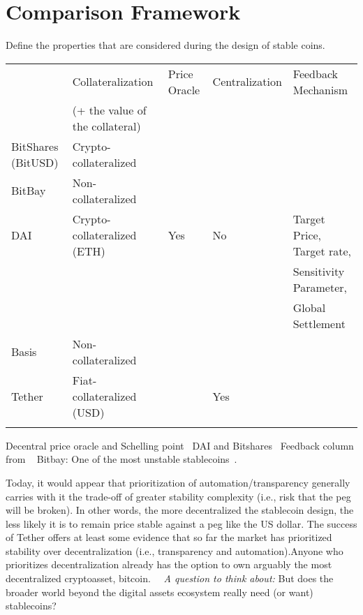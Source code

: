 \section{Comparison Framework} %
Define the properties that are considered during the design of stable coins.
~
\begin{table}[]
	\begin{tabular}{|l|l|l|l|l|}
		\hline
		& Collateralization  & Price Oracle & Centralization & Feedback Mechanism
		\\ &(+ the value of the collateral)&&&
		 \\ \hline
		BitShares (BitUSD) &  Crypto-collateralized &  & &\\ \hline
		BitBay & Non-collateralized & & & \\ \hline
		 DAI& Crypto-collateralized (ETH)  &  Yes& No & Target Price, Target rate,\\
		 &&&&Sensitivity Parameter,\\
		 &&&&Global Settlement \\ \hline
		 Basis&Non-collateralized&& &\\ \hline
		 Tether & Fiat-collateralized (USD) & & Yes &\\ \hline
		  &&&& \\ \hline
	\end{tabular}
\end{table}

Decentral price oracle and Schelling point~\cite{cryptoinsider}
DAI and Bitshares~\cite{cryptoinsider}
Feedback column from ~\cite{report}
Bitbay: One of the most unstable stablecoins~\cite{report}.

Today, it would appear that prioritization of automation/transparency generally carries with it the trade-off of greater stability complexity (i.e., risk that the peg will be broken). In other words, the more decentralized the stablecoin design, the less likely it is to remain price stable against a peg like the US dollar. The success of Tether offers at least some evidence that so far the market has prioritized stability over
decentralization (i.e., transparency and automation).Anyone who prioritizes
decentralization already has the option to own arguably the most decentralized cryptoasset, bitcoin.~\cite{report}
~\textit{A question to think about: }But does the
broader world beyond the digital assets ecosystem really need (or want) stablecoins?~\cite{report}
